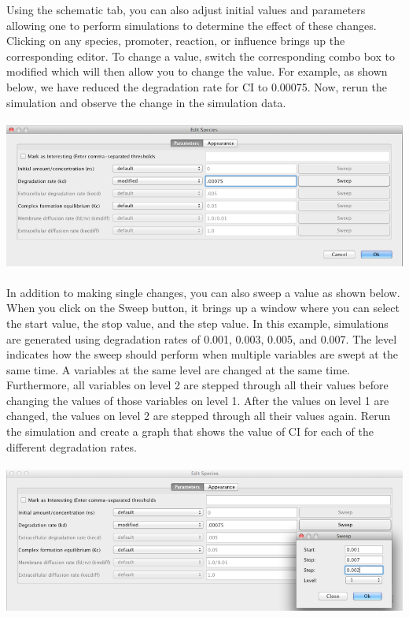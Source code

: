 \documentclass[titlepage,11pt]{article}
\begin{document}
Using the schematic tab, you can also adjust initial values and parameters allowing one to perform simulations to determine the effect of these changes.  Clicking on any species, promoter, reaction, or influence brings up the corresponding editor.  To change a value, switch the corresponding combo box to modified which will then allow you to change the value.  For example, as shown below, we have reduced the degradation rate for CI to 0.00075.  Now, rerun the simulation and observe the change in the simulation data.

\begin{center}
\includegraphics[height=50mm]{screenshots/paramEdit}
\end{center}

In addition to making single changes, you can also sweep a value as shown below.   When you click on the Sweep button, it brings up a window where you can select the start value, the stop value, and the step value.  In this example, simulations are generated using degradation rates of 0.001, 0.003, 0.005, and 0.007.  The level indicates how the sweep should perform when multiple variables are swept at the same time.  A variables at the same level are changed at the same time.  Furthermore, all variables on level 2 are stepped through all their values before changing the values of those variables on level 1.  After the values on level 1 are changed, the values on level 2 are stepped through all their values again.  Rerun the simulation and create a graph that shows the value of CI for each of the different degradation rates.

\begin{center}
\includegraphics[height=50mm]{screenshots/sweep}
\end{center}
\end{document}
